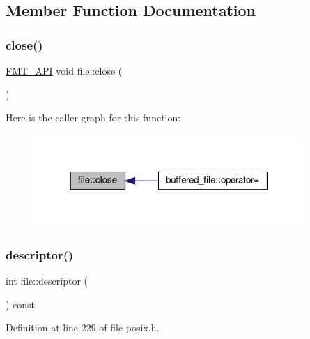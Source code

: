 \subsection{Member Function Documentation}
\mbox{\label{classfile_a843b122e594108e44d7435d57dbecce5}} 
\subsubsection{\texorpdfstring{close()}{close()}}
{\footnotesize\ttfamily \hyperlink{core_8h_a9a4960b70582ed2620911a0b75dce0b5}{F\+M\+T\+\_\+\+A\+PI} void file\+::close (\begin{DoxyParamCaption}{ }\end{DoxyParamCaption})}

Here is the caller graph for this function\+:
\nopagebreak
\begin{figure}[H]
\begin{center}
\leavevmode
\includegraphics[width=292pt]{classfile_a843b122e594108e44d7435d57dbecce5_icgraph}
\end{center}
\end{figure}
\mbox{\label{classfile_a14a03f1516c926cc0785728ebad4175c}} 
\subsubsection{\texorpdfstring{descriptor()}{descriptor()}}
{\footnotesize\ttfamily int file\+::descriptor (\begin{DoxyParamCaption}{ }\end{DoxyParamCaption}) const\hspace{0.3cm}{\ttfamily [inline]}}



Definition at line 229 of file posix.\+h.

